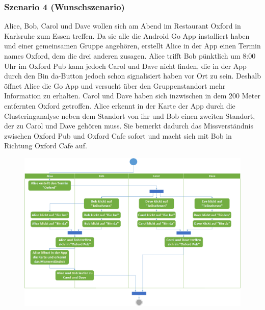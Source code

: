 \documentclass{scrartcl}
\begin{document}
	\subsubsection{Szenario 4 (Wunschszenario)}
	Alice, Bob, Carol und Dave wollen sich am Abend im Restaurant \glqq{}Oxford\grqq{} in Karlsruhe zum Essen treffen. 
	Da sie alle die Android Go App installiert haben und einer gemeinsamen Gruppe angehören, erstellt Alice in der App 		einen Termin names \glqq{}Oxford\grqq{}, dem die drei anderen zusagen. Alice trifft Bob pünktlich um 8:00 Uhr im 		\glqq{}Oxford Pub\grqq{} kann jedoch Carol und Dave nicht finden, die in der App durch den \glqq{}Bin da\grqq{}-Button 		jedoch schon signalisiert haben vor Ort zu sein. Deshalb öffnet Alice die Go App und versucht über den Gruppenstandort 		mehr Information zu erhalten. Carol und Dave haben sich inzwischen in dem 200 Meter entfernten \glqq{}Oxford 			\grqq{} getroffen. Alice erkennt in der Karte der App durch die Clusteringanalyse neben dem Standort von ihr und 		Bob einen zweiten Standort, der zu Carol und Dave gehören muss. Sie bemerkt dadurch das Missverständnis zwischen 		\glqq{}Oxford Pub\grqq{} und \glqq{}Oxford Cafe\grqq{} sofort und macht sich mit Bob in Richtung \glqq{}Oxford 			Cafe\grqq{} auf.    \newline
	\newline
	\newline
	
	
	\begin{figure}[h]
		\includegraphics[width=\textwidth]{Szenario4}
	\end{figure}
	\newpage
	
	
	
	\newpage
	
\end{document}
